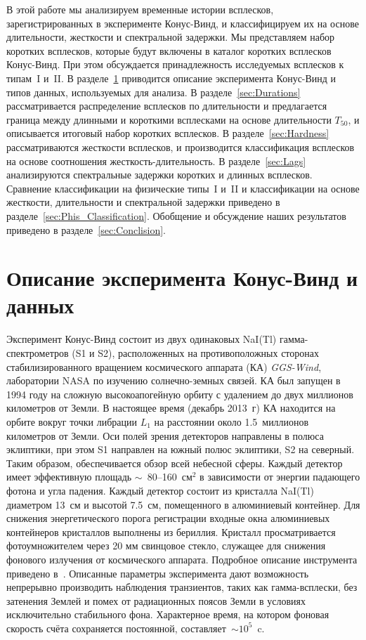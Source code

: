 В этой работе мы анализируем временные истории всплесков, зарегистрированных в эксперименте Конус-Винд, и классифицируем их на основе длительности, жесткости и спектральной задержки. Мы представляем набор коротких всплесков, которые будут включены в каталог коротких всплесков Конус-Винд. При этом обсуждается принадлежность исследуемых всплесков к типам~I и~II. В разделе~\ref{sec:KW_Description} приводится описание эксперимента Конус-Винд и типов данных, используемых для анализа. В разделе~\ref{sec:Durations} рассматривается распределение всплесков по длительности и предлагается граница между длинными и короткими всплесками на основе длительности $T_{50}$, и описывается итоговый набор коротких всплесков. В разделе~\ref{sec:Hardness} рассматриваются жесткости всплесков, и производится классификация всплесков на основе соотношения жесткость-длительность. В разделе~\ref{sec:Lags} анализируются спектральные задержки коротких и длинных всплесков. Сравнение классификации на физические типы~I и~II и классификации на основе жесткости, длительности и спектральной задержки приведено в разделе~\ref{sec:Phis_Classification}. Обобщение и обсуждение наших результатов приведено в разделе~\ref{sec:Conclision}.  

\section{Описание эксперимента Конус-Винд и данных}\label{sec:KW_Description}
Эксперимент Конус-Винд состоит из двух одинаковых NaI(Tl) гамма-спектрометров (S1 и S2), расположенных на противоположных сторонах стабилизированного вращением космического аппарата (КА) \textit{GGS-Wind}, лаборатории NASA по изучению солнечно-земных связей. КА был запущен в 1994 году на сложную высокоапогейную орбиту с удалением до двух миллионов километров от Земли. В настоящее время (декабрь 2013~г) КА находится на орбите вокруг точки либрации $L_1$ на расстоянии около 1.5~миллионов километров от Земли. Оси полей зрения детекторов направлены в полюса эклиптики, при этом S1 направлен на южный полюс эклиптики, S2 на северный. Таким образом, обеспечивается обзор всей небесной сферы. Каждый детектор имеет эффективную площадь $\sim$~80--160~см$^2$ в зависимости от энергии падающего фотона и угла падения. Каждый детектор состоит из кристалла NaI(Tl) диаметром 13~см и высотой 7.5~см, помещенного в алюминиевый контейнер. Для снижения энергетического порога регистрации входные окна алюминиевых контейнеров кристаллов выполнены из бериллия. Кристалл просматривается  фотоумножителем через 20 мм свинцовое стекло, служащее для снижения фонового излучения от космического аппарата. Подробное описание инструмента приведено в~\citep{Aptekar_1995}. Описанные параметры эксперимента дают возможность непрерывно производить наблюдения транзиентов, таких как гамма-всплески, без затенения Землей и помех от радиационных поясов Земли в условиях исключительно стабильного фона. Характерное время, на котором фоновая скорость счёта сохраняется постоянной, составляет~$\sim 10^{5}$~c. 

